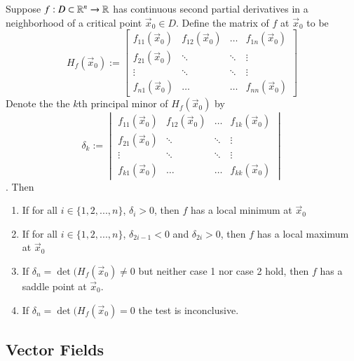 \documentclass[12pt, a4paper, oneside, openright, titlepage]{book}
\begin{document}
\begin{appendices}
    \begin{namthm}
        Suppose $f:D \subset \mathbb R^n \rightarrow \mathbb R$ has continuous second partial derivatives in a neighborhood of a critical point $\vec{x}_0 \in D$. Define the  matrix of $f$ at $\vec{x}_0$ to be \begin{equation}
            H_f(\vec{x}_0) := \begin{bmatrix} f_{11}(\vec{x}_0) & f_{12}(\vec{x}_0) & \hdots & f_{1n}(\vec{x}_0) \\ f_{21}(\vec{x}_0) & \ddots & \ddots & \vdots \\ \vdots & \ddots & \ddots & \vdots \\ f_{n1}(\vec{x}_0) & \hdots & \hdots & f_{nn}(\vec{x}_0) \end{bmatrix}
        \end{equation}
        Denote the the $k$th principal minor of $H_f(\vec{x}_0)$ by \begin{equation}
            \delta_k := \begin{vmatrix} f_{11}(\vec{x}_0) & f_{12}(\vec{x}_0) & \hdots & f_{1k}(\vec{x}_0) \\ f_{21}(\vec{x}_0) & \ddots & \ddots & \vdots \\ \vdots & \ddots & \ddots & \vdots \\ f_{k1}(\vec{x}_0) & \hdots & \hdots & f_{kk}(\vec{x}_0) \end{vmatrix}
        \end{equation}. Then \begin{enumerate}
            \item If for all $i \in \{1,2,...,n\}$, $\delta_i > 0$, then $f$ has a local minimum at $\vec{x}_0$
            \item If for all $i \in \{1,2,...,n\}$, $\delta_{2i-1} <  0$ and $\delta_{2i} > 0$, then $f$ has a local maximum at $\vec{x}_0$
            \item If $\delta_n = \det(H_f(\vec{x}_0) \neq 0$ but neither case 1 nor case 2 hold, then $f$ has a saddle point at $\vec{x}_0$.
            \item If $\delta_n = \det(H_f(\vec{x}_0) = 0$ the test is inconclusive.
        \end{enumerate}
    \end{namthm}
    
    \subsection{Vector Fields}
    

\end{appendices}
\end{document}
